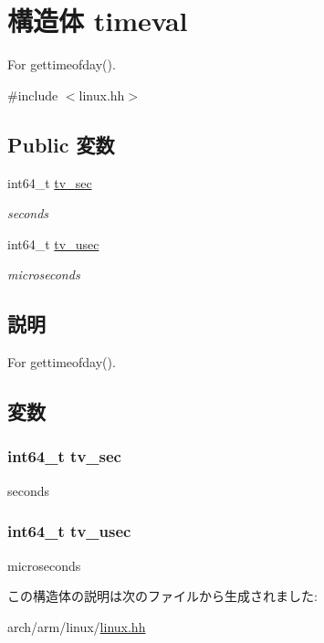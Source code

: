 \hypertarget{structArmLinux64_1_1timeval}{
\section{構造体 timeval}
\label{structArmLinux64_1_1timeval}
}


For gettimeofday().  


{\ttfamily \#include $<$linux.hh$>$}\subsection*{Public 変数}
\begin{DoxyCompactItemize}
\item 
int64\_\-t \hyperlink{structArmLinux64_1_1timeval_ade91ea7e70df7db611d15bdda30a6dd9}{tv\_\-sec}
\begin{DoxyCompactList}\small\item\em seconds \item\end{DoxyCompactList}\item 
int64\_\-t \hyperlink{structArmLinux64_1_1timeval_a73863c3643de3f79fefa8b4d6d3cfaa8}{tv\_\-usec}
\begin{DoxyCompactList}\small\item\em microseconds \item\end{DoxyCompactList}\end{DoxyCompactItemize}


\subsection{説明}
For gettimeofday(). 

\subsection{変数}
\hypertarget{structArmLinux64_1_1timeval_ade91ea7e70df7db611d15bdda30a6dd9}{
\subsubsection[{tv\_\-sec}]{\setlength{\rightskip}{0pt plus 5cm}int64\_\-t {\bf tv\_\-sec}}}
\label{structArmLinux64_1_1timeval_ade91ea7e70df7db611d15bdda30a6dd9}


seconds \hypertarget{structArmLinux64_1_1timeval_a73863c3643de3f79fefa8b4d6d3cfaa8}{
\subsubsection[{tv\_\-usec}]{\setlength{\rightskip}{0pt plus 5cm}int64\_\-t {\bf tv\_\-usec}}}
\label{structArmLinux64_1_1timeval_a73863c3643de3f79fefa8b4d6d3cfaa8}


microseconds 

この構造体の説明は次のファイルから生成されました:\begin{DoxyCompactItemize}
\item 
arch/arm/linux/\hyperlink{arch_2arm_2linux_2linux_8hh}{linux.hh}\end{DoxyCompactItemize}
